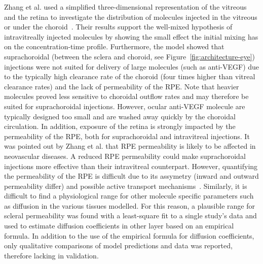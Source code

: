 \documentclass{article}
\begin{document}
Zhang et al. used a simplified three-dimensional representation of the vitreous and the retina to investigate the distribution of molecules injected in the vitreous or under the choroid~\cite{Zhang_2018}.
Their results support the well-mixed hypothesis of intravitreally injected molecules by showing the small effect the initial mixing has on the concentration-time profile.
Furthermore, the model showed that suprachoroidal (between the sclera and choroid, see Figure~\ref{fig:architecture-eye}) injections were not suited for delivery of large molecules (such as anti-VEGF) due to the typically high clearance rate of the choroid (four times higher than vitreal clearance rates) and the lack of permeability of the RPE.
Note that heavier molecules proved less sensitive to choroidal outflow rates and may therefore be suited for suprachoroidal injections.
However, ocular anti-VEGF molecule are typically designed too small and are washed away quickly by the choroidal circulation.
In addition, exposure of the retina is strongly impacted by the permeability of the RPE, both for suprachoroidal and intravitreal injections.
It was pointed out by Zhang et al. that RPE permeability is likely to be affected in neovascular diseases.
A reduced RPE permeability could make suprachoroidal injections more effective than their intravitreal counterpart.
However, quantifying the permeability of the RPE is difficult due to its assymetry (inward and outward permeability differ) and possible active transport mechanisms~\cite{Pitkaenen_2005}.
Similarly, it is difficult to find a physiological range for other molecule specific parameters such as diffusion in the various tissues modelled.
For this reason, a plausible range for scleral permeability was found with a least-square fit to a single study's data and used to estimate diffusion coefficients in other layer based on an empirical formula.
In addition to the use of the empirical formula for diffusion coefficients, only qualitative comparisons of model predictions and data was reported, therefore lacking in validation.
\end{document}
